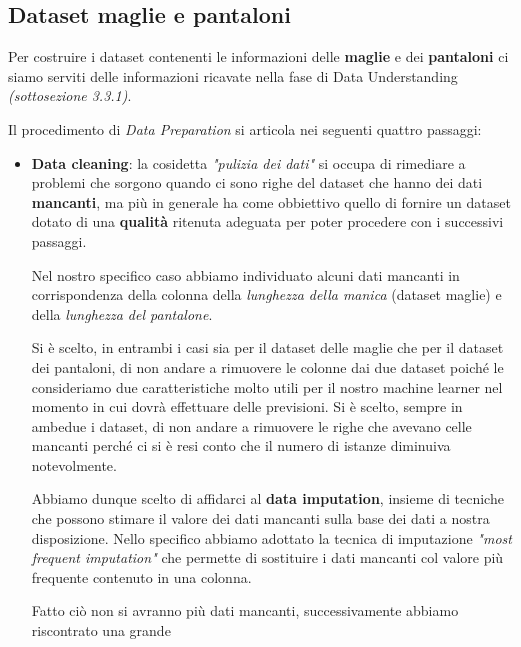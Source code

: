 \documentclass[a4paper, 11pt, oneside]{report}
\begin{document}
                \subsection{Dataset maglie e pantaloni}
                Per costruire i dataset contenenti le informazioni delle \textbf{maglie} e dei \textbf{pantaloni} ci siamo serviti delle
                informazioni ricavate nella fase di Data Understanding \textit{(sottosezione 3.3.1)}.
                \par \noindent Il procedimento di \textit{Data Preparation} si articola nei seguenti quattro passaggi:
                \begin{itemize}
                    \item \textbf{Data cleaning}: la cosidetta \textit{"pulizia dei dati"} si occupa di
                    rimediare a problemi che sorgono quando ci sono righe del dataset che hanno dei dati \textbf{mancanti}, ma più
                    in generale ha come obbiettivo quello di fornire un dataset dotato di una \textbf{qualità} ritenuta adeguata
                    per poter procedere con i successivi passaggi.
                    \par \noindent Nel nostro specifico caso abbiamo individuato alcuni dati mancanti in corrispondenza della
                    colonna della \textit{lunghezza della manica} (dataset maglie) e della \textit{lunghezza del pantalone}.
                    \par \noindent Si è scelto, in entrambi i casi sia per il dataset delle maglie che per il dataset
                    dei pantaloni, di non andare a rimuovere le colonne dai due dataset poiché le consideriamo due caratteristiche
                    molto utili per il nostro machine learner nel momento in cui dovrà effettuare delle previsioni.
                    Si è scelto, sempre in ambedue i dataset, di non andare a rimuovere le righe che avevano celle mancanti
                    perché ci si è resi conto che il numero di istanze diminuiva notevolmente.
                    \par \noindent Abbiamo dunque scelto di affidarci al \textbf{data imputation}, insieme di tecniche che
                    possono stimare il valore dei dati mancanti sulla base dei dati a nostra disposizione.
                    Nello specifico abbiamo adottato la tecnica di imputazione \textit{"most frequent imputation"} che permette
                    di sostituire i dati mancanti col valore più frequente contenuto in una colonna.
                    \par \noindent Fatto ciò non si avranno più dati mancanti, successivamente abbiamo riscontrato una grande

\end{itemize}
\end{document}
